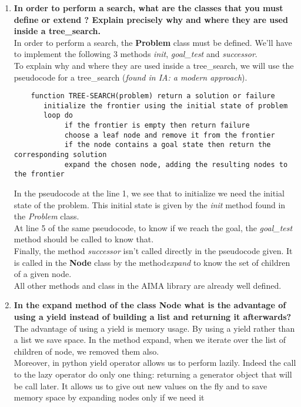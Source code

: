 \documentclass[10pt,a4paper]{article}
\begin{document}
\begin{enumerate}
	\item \textbf{In order to perform a search, what are the classes that you must define or extend ? Explain precisely why and where they are used inside a tree\_search.} \\

	
	In order to perform a search, the \textbf{Problem} class must be defined. We'll have to implement the following 3 methods  \textit{init}, \textit{goal\_test} and \textit{successor}. \\
	To explain why and where they are used inside a tree\_search, we will use the pseudocode for a tree\_search (\textit{found in IA: a modern approach}).
	\begin{verbatim}
	function TREE-SEARCH(problem) return a solution or failure
	   initialize the frontier using the initial state of problem
	   loop do
			if the frontier is empty then return failure
			choose a leaf node and remove it from the frontier
			if the node contains a goal state then return the corresponding solution
			expand the chosen node, adding the resulting nodes to the frontier
\end{verbatim}
	
	In the pseudocode at the line 1, we see that to initialize we need the initial state of the problem. This initial state is given by the \textit{init} method found in the \textit{Problem} class.\\
	At line 5 of the same pseudocode, to know if we reach the goal, the \textit{goal\_test} method should be called to know that.\\
	Finally, the method \textit{successor} isn't called directly in the pseudocode given. It is called in the \textbf{Node} class by the method\textit{expand} to know the set of children of a given node.\\
	
	All other methods and class in the AIMA library are already well defined.
	
	\item \textbf{In the expand method of the class Node what is the advantage of using a yield instead of building a list and returning it afterwards?} \\
	
	The advantage of using a yield is memory usage. By using a yield rather than a list we save space. In the method expand, when we iterate over the list of children of node, we removed them also.\\
	Moreover, in python yield operator allows us to perform lazily. Indeed the call to the lazy operator do only one thing: returning a generator object that will be call later. It allows us to give out new values on the fly and to save memory space by expanding nodes only if we need it
	

\end{enumerate}
\end{document}
